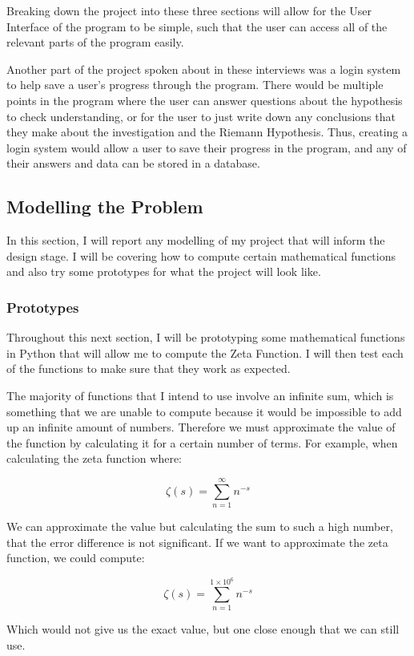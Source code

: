 \documentclass[12pt]{article}
\begin{document}
Breaking down the project into these three sections will allow for the User Interface of the program to be simple, such that the user can access all of the relevant parts of the program easily.

Another part of the project spoken about in these interviews was a login system to help save a user's progress through the program. There would be multiple points in the program where the user can answer questions about the hypothesis to check understanding, or for the user to just write down any conclusions that they make about the investigation and the Riemann Hypothesis. Thus, creating a login system would allow a user to save their progress in the program, and any of their answers and data can be stored in a database.
\clearpage
\subsection{Modelling the Problem}
In this section, I will report any modelling of my project that will inform the design stage. I will be covering how to compute certain mathematical functions and also try some prototypes for what the project will look like.

\subsubsection{Prototypes}

Throughout this next section, I will be prototyping some mathematical functions in Python that will allow me to compute the Zeta Function. I will then test each of the functions to make sure that they work as expected.

The majority of functions that I intend to use involve an infinite sum, which is something that we are unable to compute because it would be impossible to add up an infinite amount of numbers. Therefore we must approximate the value of the function by calculating it for a certain number of terms. For example, when calculating the zeta function where:

$$\zeta(s) = \sum_{n=1}^{\infty} n^{-s}$$

We can approximate the value but calculating the sum to such a high number, that the error difference is not significant. If we want to approximate the zeta function, we could compute:

$$\zeta(s) = \sum_{n=1}^{1 \times 10^6} n^{-s}$$

Which would not give us the exact value, but one close enough that we can still use.
\end{document}
